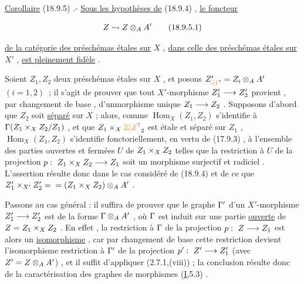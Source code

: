 \uline{Corollaire} (18.9.5) .- \uline{Sous les hypothèses de} (18.9.4) , \uline{le foncteur}

\[
Z\rightsquigarrow Z\otimes_A A'\tag*{(18.9.5.1)}
\]

\uline{de la catégorie des préschémas étales sur} $X$ , \uline{dans celle des préschémas étales sur} $X'$ , \uline{est pleinement fidèle} .

Soient $Z_1,Z_2$ deux préschémas étales sur $X$ , et posons $Z_{\unsure{i|1}}'=Z_i\handwritten{\otimes}_A A'$ $(i=1,2)$ \,;  il s'agit de prouver que tout $X'$-morphisme $Z_1'\longrightarrow Z_2'$ provient , par changement de base , d'unmorphisme unique $Z_1\longrightarrow Z_2$ .
Supposons d'abord que  $Z_2$ soit \uline{séparé} sur $X$ ; alors, comme $\operatorname{Hom}_X(Z_1,Z_2)$ s'identifie à  $\Gamma(Z_1\times_X Z_2/Z_1)$ , et que $Z_1\handwritten{\times}_X\unsure{\mathbb Z|Z}_2$ est étale et séparé sur $Z_1$ , $\operatorname{Hom}_X(Z_1,Z_2)$ s'identifie fonctoriellement, en vertu de (17.9.3) , à l'ensemble des parties ouvertes et fermées $U$ de $Z_1\times_X Z_2$ telles que la restriction à $U$ de la projection $p:\ Z_1\handwritten{\times}_X Z_2\handwritten{\longrightarrow} Z_1$ soit un morphisme surjectif et radiciel . L'assertion résulte donc dans le cas considéré de (18.9.4) et de ce que $Z_1'\times_{X'} Z_2'={}= (Z_1\times_X Z_2)\otimes_A A'$ .

Passons au cas général : il suffira de prouver que le graphe $\Gamma'$ d'un $X'$-morphisme $Z_1'\longrightarrow Z_2'$  est de la forme $\Gamma\otimes_A A'$ , où $\Gamma$ est  induit sur une partie \uline{ouverte} de $Z=Z_1\times_X Z_2$ . En effet , la restriction à $\Gamma$ de la projection $p:\ Z\longrightarrow Z_1$ est alors un \uline{isomorphisme} , car par changement de base  cette restriction devient l'isomorphisme restriction à $\Gamma'$ de la projection $p':\ Z'\longrightarrow Z_1'$ (avec $Z'=Z\otimes_A A'$) , et il suffit d'appliquer (2.7.1,(viii)) ; la conclusion résulte donc  de la caractérisation des graphes de morphismes (\uline{I},5.3) .

